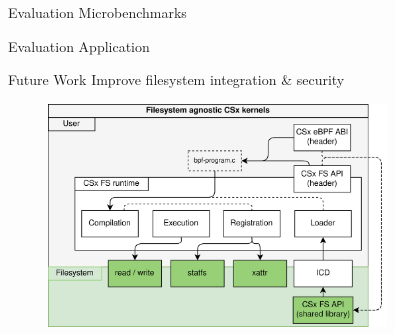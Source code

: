 \documentclass{beamer}
\begin{document}
\begin{frame}{Evaluation Microbenchmarks}
	\begingroup
	\endgroup
\end{frame}

\begin{frame}{Evaluation Application}
	\begingroup
	\endgroup
\end{frame}

\begin{frame}{Future Work}
	\begingroup
	\small Improve filesystem integration \& security
	\begin{figure}
		\centering
		\includegraphics[width=0.8\textwidth]{resources/images/csx-fs-agnostic.png}
	\end{figure}
	\endgroup
\end{frame}
\end{document}
